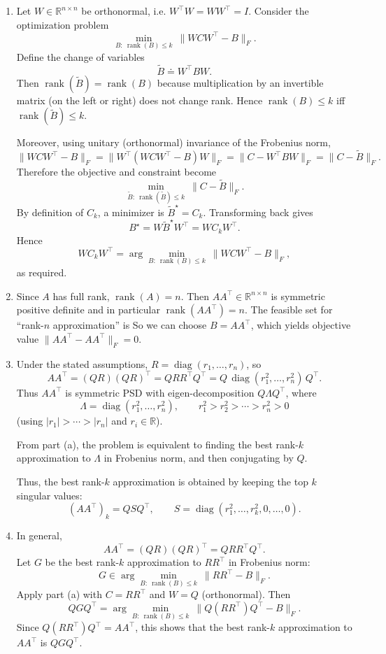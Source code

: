 \documentclass[
  12pt,
]{fphw}
\begin{document}
\begin{enumerate}
\item[(a)] Let $W\in\mathbb{R}^{n\times n}$ be orthonormal, i.e. $W^\top W = WW^\top = I$.
Consider the optimization problem
\[
\min_{B:\ \operatorname{rank}(B)\le k}\ \|WCW^\top - B\|_F.
\]
Define the change of variables
\[
\widetilde{B} \doteq W^\top B W.
\]
Then $\operatorname{rank}(\widetilde{B})=\operatorname{rank}(B)$ because multiplication by an invertible matrix
(on the left or right) does not change rank. Hence $\operatorname{rank}(B)\le k$ iff $\operatorname{rank}(\widetilde{B})\le k$.

Moreover, using unitary (orthonormal) invariance of the Frobenius norm,
\[
\|WCW^\top - B\|_F
=
\|W^\top(WCW^\top - B)W\|_F
=
\|C - W^\top B W\|_F
=
\|C - \widetilde{B}\|_F.
\]
Therefore the objective and constraint become
\[
\min_{\widetilde{B}:\ \operatorname{rank}(\widetilde{B})\le k}\ \|C-\widetilde{B}\|_F.
\]
By definition of $C_k$, a minimizer is $\widetilde{B}^\star = C_k$.
Transforming back gives
\[
B^\star = W\widetilde{B}^\star W^\top = WC_kW^\top.
\]
Hence
\[
WC_kW^\top
=
\arg\min_{B:\ \operatorname{rank}(B)\le k}\ \|WCW^\top - B\|_F,
\]
as required.

\item[(b)] Since $A$ has full rank, $\operatorname{rank}(A)=n$. Then $AA^\top\in\mathbb{R}^{n\times n}$ is symmetric positive definite
and in particular $\operatorname{rank}(AA^\top)=n$. The feasible set for ``rank-$n$ approximation'' is
So we can choose $B=AA^\top$, which yields objective value $\|AA^\top-AA^\top\|_F=0$.

\item[(c)] Under the stated assumptions, $R=\operatorname{diag}(r_1,\dots,r_n)$, so
\[
AA^\top = (QR)(QR)^\top = QRR^\top Q^\top
= Q\,\operatorname{diag}(r_1^2,\dots,r_n^2)\,Q^\top.
\]
Thus $AA^\top$ is symmetric PSD with eigen-decomposition $Q\Lambda Q^\top$, where
\[
\Lambda=\operatorname{diag}(r_1^2,\dots,r_n^2),
\qquad
r_1^2>r_2^2>\cdots>r_n^2>0
\]
(using $|r_1|>\cdots>|r_n|$ and $r_i\in\mathbb{R}$).

From part (a), the problem is equivalent to finding the best rank-$k$ approximation to $\Lambda$ in Frobenius norm, and then conjugating by $Q$.

Thus, the best rank-$k$ approximation is obtained by keeping the top $k$ singular values:
\[
(AA^\top)_k = Q S Q^\top,
\qquad
S=\operatorname{diag}(r_1^2,\dots,r_k^2,0,\dots,0).
\]

\item[(d)] In general,
\[
AA^\top = (QR)(QR)^\top = QRR^\top Q^\top.
\]
Let $G$ be the best rank-$k$ approximation to $RR^\top$ in Frobenius norm:
\[
G \in \arg\min_{B:\ \operatorname{rank}(B)\le k}\ \|RR^\top - B\|_F.
\]
Apply part (a) with $C=RR^\top$ and $W=Q$ (orthonormal). Then
\[
QGQ^\top
=
\arg\min_{B:\ \operatorname{rank}(B)\le k}\ \|Q(RR^\top)Q^\top - B\|_F.
\]
Since $Q(RR^\top)Q^\top = AA^\top$, this shows that the best rank-$k$ approximation to $AA^\top$ is $QGQ^\top$.
\end{enumerate}
\end{document}
